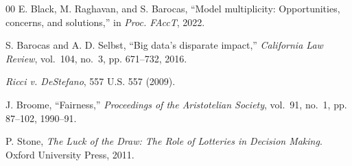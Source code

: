 \documentclass[9pt,conference]{IEEEtran}
\begin{document}
\begin{thebibliography}{00}
 E. Black, M. Raghavan, and S. Barocas, ``Model multiplicity: Opportunities,
concerns, and solutions,'' in \emph{Proc. FAccT}, 2022.

 S. Barocas and A. D. Selbst, ``Big data's disparate impact,''
\emph{California Law Review}, vol.~104, no.~3, pp. 671--732, 2016.

 \emph{Ricci v. DeStefano}, 557 U.S. 557 (2009).

 J. Broome, ``Fairness,'' \emph{Proceedings of the Aristotelian
Society}, vol.~91, no.~1, pp. 87--102, 1990--91.

 P. Stone, \emph{The Luck of the Draw: The Role of Lotteries in
Decision Making}. Oxford University Press, 2011.

\end{thebibliography}
\end{document}
